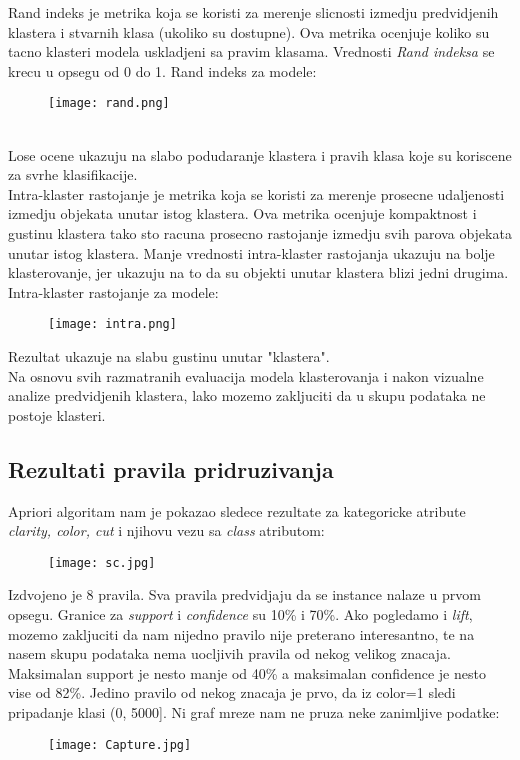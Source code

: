 \documentclass[10pt]{article}
\begin{document}
Rand indeks je metrika koja se koristi za merenje slicnosti izmedju predvidjenih klastera i stvarnih klasa (ukoliko su dostupne). Ova metrika ocenjuje koliko su tacno klasteri modela uskladjeni sa pravim klasama.
Vrednosti \textit{Rand indeksa} se krecu u opsegu od 0 do 1. Rand indeks za modele:
\begin{figure}[h]
    \centering
    \texttt{[image: rand.png]}
    \label{Slika13}
\end{figure}
\\

Lose ocene ukazuju na slabo podudaranje klastera i pravih klasa koje su koriscene za svrhe klasifikacije.\\

Intra-klaster rastojanje je metrika koja se koristi za merenje prosecne udaljenosti izmedju objekata unutar istog klastera. Ova metrika ocenjuje kompaktnost i gustinu klastera tako sto racuna prosecno rastojanje izmedju svih parova objekata unutar istog klastera. Manje vrednosti intra-klaster rastojanja ukazuju na bolje klasterovanje, jer ukazuju na to da su objekti unutar klastera blizi jedni drugima. Intra-klaster rastojanje za modele:
\begin{figure}[h]
    \centering
    \texttt{[image: intra.png]}
    \label{Slika14}
\end{figure}

Rezultat ukazuje na slabu gustinu unutar "klastera".\\


Na osnovu svih razmatranih evaluacija modela klasterovanja i nakon vizualne analize predvidjenih klastera, lako mozemo zakljuciti da u skupu podataka ne postoje klasteri.

\newpage
\subsection*{Rezultati pravila pridruzivanja}
Apriori algoritam nam je pokazao sledece rezultate za kategoricke atribute \textit{clarity, color, cut} i njihovu vezu sa \textit{class} atributom:
\begin{figure}[h]
    \centering
    \texttt{[image: sc.jpg]}
    \label{Slika16}
\end{figure}

Izdvojeno je 8 pravila. Sva pravila predvidjaju da se instance nalaze u prvom opsegu. Granice za \textit{support} i \textit{confidence} su 10\% i 70\%. Ako pogledamo i \textit{lift}, mozemo zakljuciti da nam nijedno pravilo nije preterano interesantno, te na nasem skupu podataka nema uocljivih pravila od nekog velikog znacaja. Maksimalan support je nesto manje od 40\% a maksimalan confidence je nesto vise od 82\%. Jedino pravilo od nekog znacaja je prvo, da iz color=1 sledi pripadanje klasi (0, 5000]. Ni graf mreze nam ne pruza neke zanimljive podatke:\pagebreak
\begin{figure}[h]
    \centering
    \texttt{[image: Capture.jpg]}
    \label{Slika17}
\end{figure}
\end{document}
